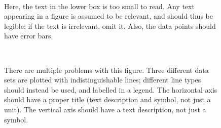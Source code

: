 \documentclass[11pt,a4paper]{article}
\begin{document}
\begin{figure}
  \centering
   \\
  \caption{\small Here, the text in the lower box is too small to
    read.  Any text appearing in a figure is assumed to be relevant,
    and should thus be legible; if the text is irrelevant, omit it.
    Also, the data points should have error bars.}
\end{figure}

\begin{figure}
  \centering
   \\
  \caption{\small There are multiple problems with this figure.  Three
    different data sets are plotted with indistinguishable lines;
    different line types should instead be used, and labelled in a
    legend.  The horizontal axis should have a proper title (text
    description and symbol, not just a unit).  The vertical axis
    should have a text description, not just a symbol.  }
\end{figure}
\end{document}
